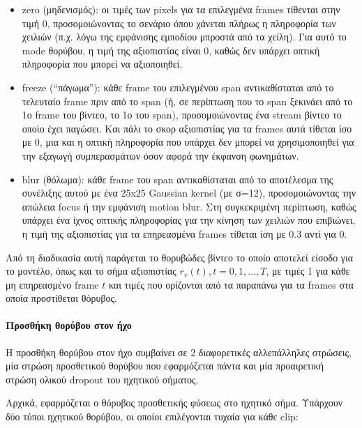 \begin{itemize}
\item zero (μηδενισμός): οι τιμές των pixels για τα επιλεγμένα frames τίθενται στην τιμή 0, προσομοιώνοντας το σενάριο όπου χάνεται πλήρως η πληροφορία των χειλιών (π.χ. λόγω της εμφάνισης εμποδίου μπροστά από τα χείλη). Για αυτό το mode θορύβου, η τιμή της αξιοπιστίας είναι 0, καθώς δεν υπάρχει οπτική πληροφορία που μπορεί να αξιοποιηθεί.

\item freeze (``πάγωμα''): κάθε frame του επιλεγμένου span αντικαθίσταται από το τελευταίο frame πριν από το span (ή, σε περίπτωση που το span ξεκινάει από το 1ο frame του βίντεο, το 1ο του span), προσομοιώνοντας ένα stream βίντεο το οποίο έχει παγώσει. Και πάλι το σκορ αξιοπιστίας για τα frames αυτά τίθεται ίσο με 0, μια και η οπτική πληροφορία που υπάρχει δεν μπορεί να χρησιμοποιηθεί για την εξαγωγή συμπερασμάτων όσον αφορά την έκφανση φωνημάτων. 

\item blur (θόλωμα): κάθε frame του span αντικαθίσταται από το αποτέλεσμα της συνέλιξης αυτού με ένα 25x25 Gaussian kernel (με σ=12), προσομοιώνοντας την απώλεια focus ή την εμφάνιση motion blur. Στη συγκεκριμένη περίπτωση, καθώς υπάρχει ένα ίχνος οπτικής πληροφορίας για την κίνηση των χειλιών που επιβιώνει, η τιμή της αξιοπιστίας για τα επηρεασμένα frames τίθεται ίση με 0.3 αντί για 0.
\end{itemize}

Από τη διαδικασία αυτή παράγεται το θορυβώδες βίντεο το οποίο αποτελεί είσοδο για το μοντέλο, όπως και το σήμα αξιοπιστίας $r_v(t), t = 0,1,...,T$, με τιμές 1 για κάθε μη επηρεασμένο frame $t$ και τιμές που ορίζονται από τα παραπάνω για τα frames στα οποία προστίθεται θόρυβος.

\paragraph{Προσθήκη θορύβου στον ήχο}

 Η προσθήκη θορύβου στον ήχο συμβαίνει σε 2 διαφορετικές αλλεπάλληλες στρώσεις, μία στρώση προσθετικού θορύβου που εφαρμόζεται πάντα και μία προαιρετική στρώση ολικού dropout του ηχητικού σήματος.
 
 Αρχικά, εφαρμόζεται ο θόρυβος προσθετικής φύσεως στο ηχητικό σήμα. Υπάρχουν δύο τύποι ηχητικού θορύβου, οι οποίοι επιλέγονται τυχαία για κάθε clip:
 

